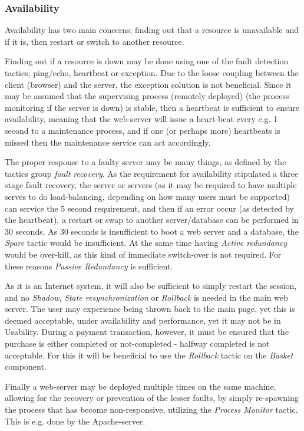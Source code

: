 \subsubsection{Availability}
Availability has two main concerns; finding out that a resource is unavailable and if it is, then restart or switch to another resource. 

Finding out if a resource is down may be done using one of the fault detection tactics; ping/echo, heartbeat or exception. Due to the loose coupling between the client (browser) and the server, the exception solution is not beneficial. Since it may be assumed that the supervising process (remotely deployed) (the process monitoring if the server is down) is stable, then a heartbeat is sufficient to ensure availability, meaning that the web-server will issue a heart-beat every e.g. 1 second to a maintenance process, and if one (or perhaps more) heartbeats is missed then the maintenance service can act accordingly.

The proper response to a faulty server may be many things, as defined by the tactics group \emph{fault recovery}. As the requirement for availability stipulated a three stage fault recovery, the server or servers (as it may be required to have multiple serves to do load-balancing, depending on how many users must be supported) can service the 5 second requirement, and then if an error occur (as detected by the heartbeat), a restart or swap to another server/database can be performed in 30 seconds. As 30 seconds is insufficient to boot a web server and a database, the \emph{Spare} tactic would be insufficient. At the same time having \emph{Active redundancy} would be over-kill, as this kind of immediate switch-over is not required. For these reasons \emph{Passive Redundancy} is sufficient.

As it is an Internet system, it will also be sufficient to simply restart the session, and no \emph{Shadow}, \emph{State resynchronization} or \emph{Rollback} is needed in the main web server. The user may experience being thrown back to the main page, yet this is deemed acceptable, under availability and performance, yet it may not be in Usability. During a payment transaction, however, it must be ensured that the purchase is either completed or not-completed - halfway completed is not acceptable. For this it will be beneficial to use the \emph{Rollback} tactic on the \emph{Basket} component.

Finally a web-server may be deployed multiple times on the same machine, allowing for the recovery or prevention of the lesser faults, by simply re-spawning the process that has become non-responsive, utilizing the \emph{Process Monitor} tactic. This is e.g. done by the Apache-server.

